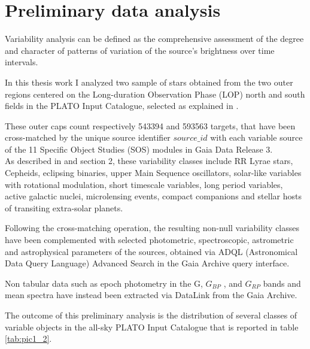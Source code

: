 \section{Preliminary data analysis}


Variability analysis can be defined as the comprehensive assessment of the degree and character of patterns of variation of the source's brightness over time intervals. %

In this thesis work I analyzed two sample of stars  obtained from the two outer regions centered on the Long-duration Observation Phase (LOP) north and south fields in the PLATO Input Catalogue, selected as explained in \cite{Nascimbeni_2022}.

These outer caps count respectively 543394 and 593563 targets, that have been cross-matched by the unique source identifier $\textit{source\_id}$ with each variable source of the 11 Specific Object Studies (SOS) modules in Gaia Data Release 3.\\
As described in \cite{Eyer} and section 2, these variability classes include RR Lyrae stars, Cepheids, eclipsing binaries, upper Main Sequence oscillators, solar-like variables with rotational modulation, short timescale variables, long period variables, active galactic nuclei, microlensing events, compact companions
and stellar hosts of transiting extra-solar planets.

Following the cross-matching operation, the resulting non-null variability classes have been complemented with selected photometric, spectroscopic, astrometric and astrophysical parameters of the sources, obtained via ADQL (Astronomical Data Query Language) Advanced Search in the Gaia Archive query interface.
	



Non tabular data such as epoch photometry in the G, $G_{BP}$ , and $G_{RP}$ bands and mean spectra
have instead been extracted via DataLink from the Gaia Archive.

The outcome of this preliminary analysis is the distribution of several classes of variable objects in the all-sky PLATO Input Catalogue that is reported in table \ref{tab:pic1_2}.

